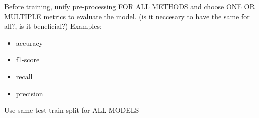 \documentclass{article}
\begin{document}
\noindent
Before training, unify pre-processing FOR ALL METHODS and choose ONE OR MULTIPLE metrics to evaluate the model.
(is it neccesary to have the same for all?, is it beneficial?) Examples:
\begin{itemize}
    \item accuracy
    \item f1-score
    \item recall
    \item precision
\end{itemize}

\noindent
Use same test-train split for ALL MODELS
\end{document}
